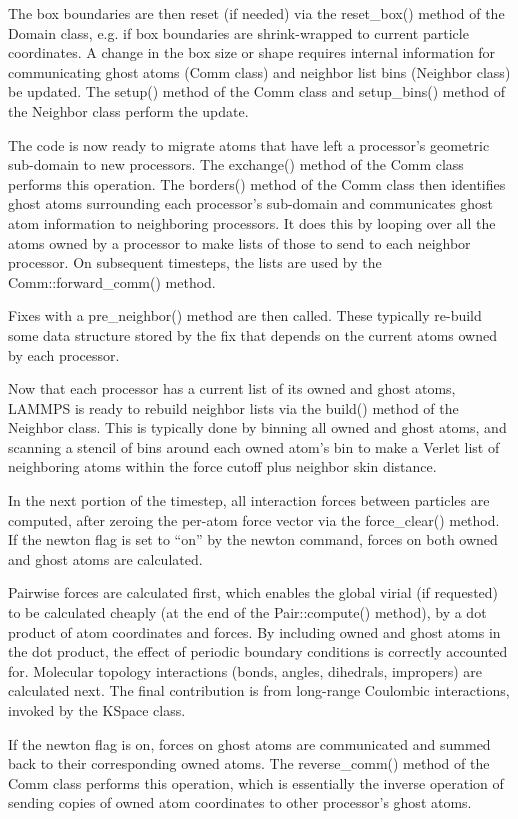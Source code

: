 \documentclass{article}
\begin{document}
The box boundaries are then reset (if needed) via the reset\_box()
method of the Domain class, e.g. if box boundaries are shrink-wrapped
to current particle coordinates.  A change in the box size or shape
requires internal information for communicating ghost atoms (Comm
class) and neighbor list bins (Neighbor class) be updated.  The
setup() method of the Comm class and setup\_bins() method of the
Neighbor class perform the update.

The code is now ready to migrate atoms that have left a processor's
geometric sub-domain to new processors.  The exchange() method of the
Comm class performs this operation.  The borders() method of the Comm
class then identifies ghost atoms surrounding each processor's
sub-domain and communicates ghost atom information to neighboring
processors.  It does this by looping over all the atoms owned by a
processor to make lists of those to send to each neighbor processor.
On subsequent timesteps, the lists are used by the
Comm::forward\_comm() method.

Fixes with a pre\_neighbor() method are then called.  These typically
re-build some data structure stored by the fix that depends on the
current atoms owned by each processor.

Now that each processor has a current list of its owned and ghost
atoms, LAMMPS is ready to rebuild neighbor lists via the build()
method of the Neighbor class.  This is typically done by binning all
owned and ghost atoms, and scanning a stencil of bins around each
owned atom's bin to make a Verlet list of neighboring atoms within the
force cutoff plus neighbor skin distance.

In the next portion of the timestep, all interaction forces between
particles are computed, after zeroing the per-atom force vector via
the force\_clear() method.  If the newton flag is set to ``on'' by the
newton command, forces on both owned and ghost atoms are calculated.

Pairwise forces are calculated first, which enables the global virial
(if requested) to be calculated cheaply (at the end of the
Pair::compute() method), by a dot product of atom coordinates and
forces.  By including owned and ghost atoms in the dot product, the
effect of periodic boundary conditions is correctly accounted for.
Molecular topology interactions (bonds, angles, dihedrals, impropers)
are calculated next.  The final contribution is from long-range
Coulombic interactions, invoked by the KSpace class.

If the newton flag is on, forces on ghost atoms are communicated and
summed back to their corresponding owned atoms.  The reverse\_comm()
method of the Comm class performs this operation, which is essentially
the inverse operation of sending copies of owned atom coordinates to
other processor's ghost atoms.
\end{document}

